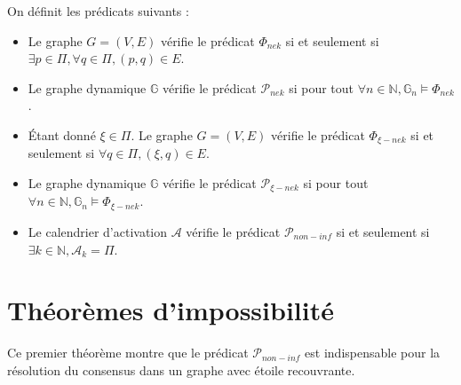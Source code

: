 \documentclass{article}
\begin{document}
On définit les prédicats suivants :
\begin{itemize}
	\item Le graphe $G = (V, E)$ vérifie le prédicat $\Phi_{nek}$ si et seulement si $\exists p \in \Pi, \forall q \in \Pi, (p, q) \in E$.
	\item Le graphe dynamique $\mathds{G}$ vérifie le prédicat $\mathcal{P}_{nek}$ si pour tout $\forall n \in \mathds{N}, \mathds{G}_n \models \Phi_{nek}$. 
	\item Étant donné $\xi \in \Pi$. Le graphe $G = (V, E)$ vérifie le prédicat $\Phi_{\xi-nek}$ si et seulement si $\forall q \in \Pi, (\xi, q) \in E$.
	\item Le graphe dynamique $\mathds{G}$ vérifie le prédicat $\mathcal{P}_{\xi-nek}$ si pour tout $\forall n \in \mathds{N}, \mathds{G}_n \models \Phi_{\xi-nek}$. 
	\item Le calendrier d'activation $\mathcal{A}$ vérifie le prédicat $\mathcal{P}_{non-inf}$ si et seulement si $\exists k \in \mathds{N}, \mathcal{A}_k = \Pi$.
\end{itemize}

\section{Théorèmes d'impossibilité}

Ce premier théorème montre que le prédicat $\mathcal{P}_{non-inf}$ est indispensable pour la résolution du consensus dans un graphe avec étoile recouvrante.
\end{document}
